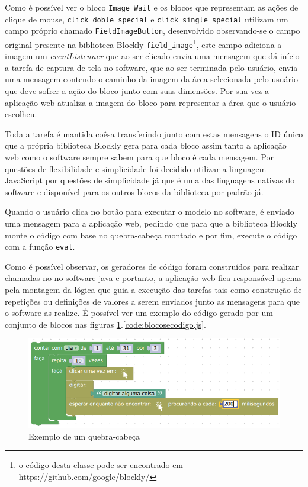 \documentclass[tg]{mdtufsm}
\begin{document}
                    Como é possível ver o bloco \texttt{Image\_Wait} e os blocos que representam as ações de clique de mouse, \texttt{click\_doble\_special} e \texttt{click\_single\_special} utilizam um campo próprio chamado \texttt{FieldImageButton}, desenvolvido observando-se o campo original presente na biblioteca Blockly \texttt{field\_image}\footnote{o código desta classe pode ser encontrado em https://github.com/google/blockly/}, este campo adiciona a imagem um \emph{eventListenner} que ao ser clicado envia uma mensagem que dá início a tarefa de captura de tela no software, que ao ser terminada pelo usuário, envia uma mensagem contendo o caminho da imagem da área selecionada pelo usuário que deve sofrer a ação do bloco junto com suas dimensões. Por sua vez a aplicação web atualiza a imagem do bloco para representar a área que o usuário escolheu.

                    Toda a tarefa é mantida coêsa transferindo junto com estas mensagens o ID único que a própria biblioteca Blockly gera para cada bloco assim tanto a aplicação web como o software sempre sabem para que bloco é cada mensagem. Por questões de flexibilidade e simplicidade foi decidido utilizar a linguagem JavaScript por questões de simplicidade já que é uma das linguagens nativas do software e disponível para os outros blocos da biblioteca por padrão já.

                    Quando o usuário clica no botão para executar o modelo no software, é enviado uma mensagem para a aplicação web, pedindo que para que a biblioteca Blockly monte o código com base no quebra-cabeça montado e por fim, execute o código com a função \texttt{eval}.

                    Como é possível observar, os geradores de código foram construídos para realizar chamadas no no software java e portanto, a aplicação web fica responsável apenas pela montagem da lógica que guia a execução das tarefas tais como construção de repetições ou definições de valores a serem enviados junto as mensagens para que o software as realize. É possível ver um exemplo do código gerado por um conjunto de blocos nas figuras \ref{fig:blocosecodigo}.\ref{code:blocosecodigo.js}.

                    \begin{figure}[!htb]
                        {\centering
                        \includegraphics[width=1.0\textwidth]{imagens/blocosecodigo.png}
                        \caption{Exemplo de um quebra-cabeça}
                        \label{fig:blocosecodigo}}
                    \end{figure}
\end{document}
